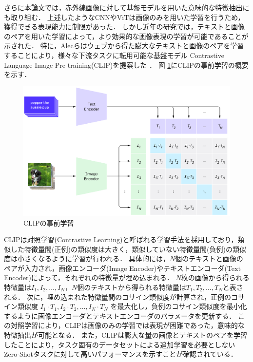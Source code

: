 \documentclass[a4paper,11pt,nomag]{jsreport}
\begin{document}
さらに本論文では，赤外線画像に対して基盤モデルを用いた意味的な特徴抽出にも取り組む．
上述したようなCNNやViTは画像のみを用いた学習を行うため，獲得できる表現能力に制限があった．
しかし近年の研究では，テキストと画像のペアを用いた学習によって，より効果的な画像表現の学習が可能であることが示された．
特に，Alecらはウェブから得た膨大なテキストと画像のペアを学習することにより，様々な下流タスクに転用可能な基盤モデル Contrastive Language-Image Pre-training(CLIP)を提案した \cite{clip}．
図 \ref{fig:clip-a}にCLIPの事前学習の概要を示す．
% 
\begin{figure}[tbp]
  \centering
  \includegraphics[width=\linewidth, keepaspectratio]{image/clip-a.png}
  \caption{CLIPの事前学習}
  \label{fig:clip-a}
\end{figure}
% 
CLIPは対照学習(Contrastive Learning)と呼ばれる学習手法を採用しており，類似した特徴量間(正例)の類似度は大きく，類似していない特徴量間(負例)の類似度は小さくなるように学習が行われる．
具体的には，$N$個のテキストと画像のペアが入力され，画像エンコーダ(Image Encoder)やテキストエンコーダ(Text Encoder)によって，それぞれの特徴量が埋め込まれる．
$N$枚の画像から得られる特徴量は$I_1, I_2, \ldots, I_N$，$N$個のテキストから得られる特徴量は$T_1, T_2, \ldots, T_N$と表される．
次に，埋め込まれた特徴量間のコサイン類似度が計算され，正例のコサイン類似度 $I_1 \cdot T_1, I_2 \cdot T_2, \ldots, I_N \cdot T_N$ を最大化し，負例のコサイン類似度を最小化するように画像エンコーダとテキストエンコーダのパラメータを更新する．
この対照学習により，CLIPは画像のみの学習では表現が困難であった，意味的な特徴抽出が可能となる．
また，CLIPは膨大な量の画像とテキストのペアを学習したことにより，タスク固有のデータセットによる追加学習を必要としないZero-Shotタスクに対して高いパフォーマンスを示すことが確認されている．
\end{document}
